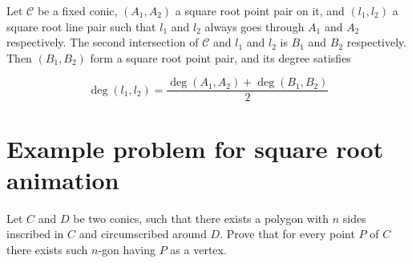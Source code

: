 \documentclass[a4paper]{article}
\begin{document}
\begin{theorem} 

    Let $\mathcal{C}$ be a fixed conic, $(A_1,A_2)$ a square root point pair on it, and $(l_1,l_2)$ a square root line pair such that $l_1$ and $l_2$ always goes through $A_1$ and $A_2$ respectively. The second intersection of $\mathcal{C}$ and $l_1$ and $l_2$ is $B_1$ and $B_2$ respectively. Then $(B_1,B_2)$ form a square root point pair, and its degree satisfies

    $$\deg (l_1,l_2) = \frac{\deg (A_1,A_2)+\deg (B_1,B_2)}{2}$$

\end{theorem}


\section{Example problem for square root animation}

\begin{exercise}
    Let $C$ and $D$ be two conics, such that there exists a polygon with $n$ sides inscribed in $C$ and circumscribed around $D$. Prove that for every point $P$ of $C$ there exists such $n$-gon having $P$ as a vertex.
\end{exercise}
\end{document}
